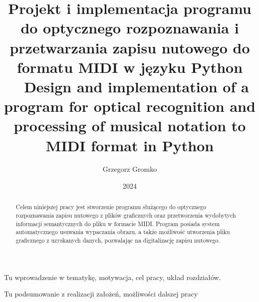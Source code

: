 \documentclass[xodstep]{wnspt}
\author      {Grzegorz Gromko}
\date        {2024}
\title{ Projekt i implementacja programu do optycznego rozpoznawania i przetwarzania zapisu nutowego do formatu MIDI w języku Python
\\{~}
Design and implementation of a program for optical recognition and processing of musical notation to MIDI format in Python}
\begin{document}
\maketitle
\onehalfspacing

\begin{abstract}
	Celem niniejszej pracy jest stworzenie programu służącego do optycznego rozpoznawania zapisu nutowego z plików graficznych oraz przetworzenia wydobytych informacji semantycznych do pliku w formacie MIDI. Program posiada system automatycznego usuwania wypaczania obrazu, a także możliwość utworzenia pliku graficznego z uzyskanych danych, pozwalając na digitalizację zapisu nutowego.
\end{abstract}



\introduction

Tu wprowadzenie w tematykę, motywacja, cel pracy, układ rozdziałów.







\summary
Tu podsumowanie z realizacji założeń, możliwości dalszej pracy




\listoftables

\listoffigures

\lstlistoflistings
\end{document}
